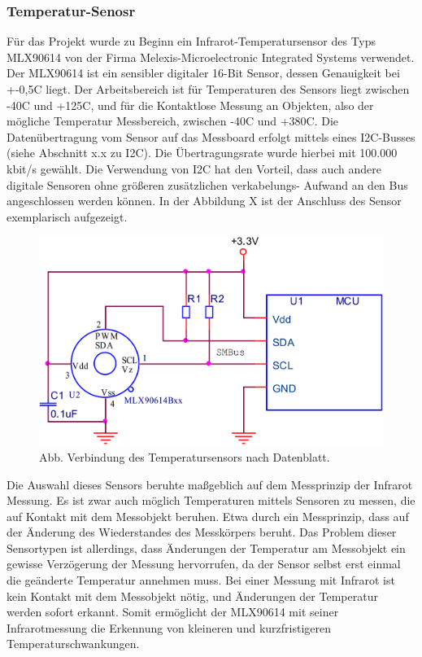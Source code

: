 \subsubsection{Temperatur-Senosr} \label{temp-1}

Für das Projekt wurde zu Beginn ein Infrarot-Temperatursensor des Typs MLX90614 von der Firma Melexis-Microelectronic Integrated Systems verwendet. Der MLX90614 ist ein sensibler digitaler  16-Bit Sensor, dessen Genauigkeit bei +-0,5C liegt. Der Arbeitsbereich ist für Temperaturen des Sensors liegt zwischen -40C und +125C, und für die Kontaktlose Messung an Objekten, also der mögliche Temperatur Messbereich, zwischen -40C und +380C. Die Datenübertragung vom Sensor auf das Messboard erfolgt mittels eines I2C-Busses (siehe Abschnitt x.x zu I2C). Die Übertragungsrate wurde hierbei mit 100.000 kbit/s gewählt. Die Verwendung von I2C hat den Vorteil, dass auch andere digitale Sensoren ohne größeren zusätzlichen verkabelungs- Aufwand an den Bus angeschlossen werden können. In der Abbildung X ist der Anschluss des Sensor exemplarisch aufgezeigt.

\begin{figure}[H] \centering
\includegraphics[width=\textwidth]{Images/Temp_Sensor.png} 
\vspace{-0.3cm} 
\caption{Abb.  Verbindung des Temperatursensors nach Datenblatt.}
\label{fig-elise} 
\end{figure}

Die Auswahl dieses Sensors beruhte maßgeblich auf dem Messprinzip der Infrarot Messung. Es ist zwar auch möglich Temperaturen mittels Sensoren zu messen, die auf Kontakt mit dem Messobjekt beruhen. Etwa durch ein Messprinzip, dass auf der Änderung des Wiederstandes des Messkörpers beruht. Das Problem dieser Sensortypen ist allerdings, dass Änderungen der Temperatur am Messobjekt ein gewisse Verzögerung der Messung hervorrufen, da der Sensor selbst erst einmal die geänderte Temperatur annehmen muss. Bei einer Messung mit Infrarot ist kein Kontakt mit dem Messobjekt nötig, und Änderungen der Temperatur werden sofort erkannt. Somit ermöglicht der MLX90614 mit seiner Infrarotmessung die Erkennung von kleineren und kurzfristigeren Temperaturschwankungen.

